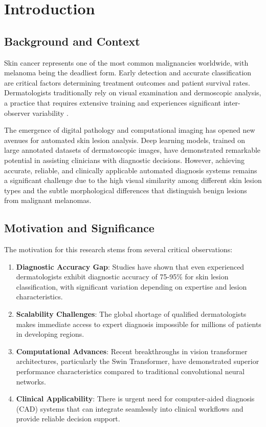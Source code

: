 \chapter{Introduction}
\label{ch:introduction}

\section{Background and Context}

Skin cancer represents one of the most common malignancies worldwide, with melanoma being the deadliest form. Early detection and accurate classification are critical factors determining treatment outcomes and patient survival rates. Dermatologists traditionally rely on visual examination and dermoscopic analysis, a practice that requires extensive training and experiences significant inter-observer variability \cite{esteva2019dermatologist}.

The emergence of digital pathology and computational imaging has opened new avenues for automated skin lesion analysis. Deep learning models, trained on large annotated datasets of dermatoscopic images, have demonstrated remarkable potential in assisting clinicians with diagnostic decisions. However, achieving accurate, reliable, and clinically applicable automated diagnosis systems remains a significant challenge due to the high visual similarity among different skin lesion types and the subtle morphological differences that distinguish benign lesions from malignant melanomas.

\section{Motivation and Significance}

The motivation for this research stems from several critical observations:

\begin{enumerate}
    \item \textbf{Diagnostic Accuracy Gap}: Studies have shown that even experienced dermatologists exhibit diagnostic accuracy of 75-95\% for skin lesion classification, with significant variation depending on expertise and lesion characteristics.
    
    \item \textbf{Scalability Challenges}: The global shortage of qualified dermatologists makes immediate access to expert diagnosis impossible for millions of patients in developing regions.
    
    \item \textbf{Computational Advances}: Recent breakthroughs in vision transformer architectures, particularly the Swin Transformer, have demonstrated superior performance characteristics compared to traditional convolutional neural networks.
    
    \item \textbf{Clinical Applicability}: There is urgent need for computer-aided diagnosis (CAD) systems that can integrate seamlessly into clinical workflows and provide reliable decision support.
\end{enumerate}

